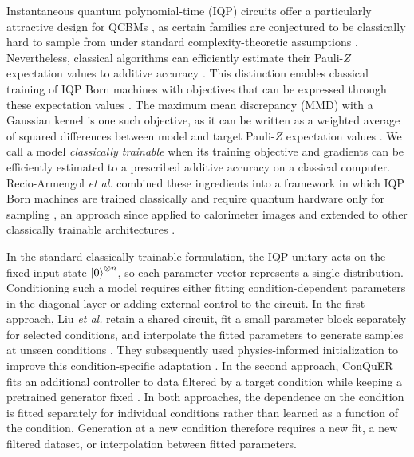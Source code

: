 \documentclass[pra,aps,10pt,twocolumn,floatfix,superscriptaddress, notitlepage,longbibliography]{revtex4-2}
\begin{document}
Instantaneous quantum polynomial-time (IQP) circuits \cite{shepherdInstantaneousQuantumComputation2009} offer a particularly attractive design for QCBMs \cite{coyleBornSupremacyQuantum2020}, as certain families are conjectured to be classically hard to sample from under standard complexity-theoretic assumptions \cite{bremnerClassicalSimulationCommuting2011,bremnerAverageCaseComplexityApproximate2016,bremnerAchievingQuantumSupremacy2017,marshallImprovedSeparationQuantum2024}. Nevertheless, classical algorithms can efficiently estimate their Pauli-$Z$ expectation values to additive accuracy \cite{nestSimulatingQuantumComputers2011}. This distinction enables classical training of IQP Born machines with objectives that can be expressed through these expectation values \cite{kastureProtocolsClassicallyTraining2023}. The maximum mean discrepancy (MMD) with a Gaussian kernel is one such objective, as it can be written as a weighted average of squared differences between model and target Pauli-$Z$ expectation values \cite{grettonKernelTwoSample2012,rudolphTrainabilityBarriersOpportunities2024}. We call a model \emph{classically trainable} when its training objective and gradients can be efficiently estimated to a prescribed additive accuracy on a classical computer. Recio-Armengol \textit{et al.} combined these ingredients into a framework in which IQP Born machines are trained classically and require quantum hardware only for sampling \cite{recio-armengolTrainClassicalDeploy2026}, an approach since applied to calorimeter images and extended to other classically trainable architectures \cite{slimIQPCalorimeter2026,huangSpectralBorn2026}.

In the standard classically trainable formulation, the IQP unitary acts on the fixed input state $\ket{0}^{\otimes n}$, so each parameter vector represents a single distribution. Conditioning such a model requires either fitting condition-dependent parameters in the diagonal layer or adding external control to the circuit. In the first approach, Liu \textit{et al.} retain a shared circuit, fit a small parameter block separately for selected conditions, and interpolate the fitted parameters to generate samples at unseen conditions \cite{liuCorrelationComplexity2026}. They subsequently used physics-informed initialization to improve this condition-specific adaptation \cite{liuPhysicsInformedLatent2026}. In the second approach, ConQuER fits an additional controller to data filtered by a target condition while keeping a pretrained generator fixed \cite{zouConQuER2025}. In both approaches, the dependence on the condition is fitted separately for individual conditions rather than learned as a function of the condition. Generation at a new condition therefore requires a new fit, a new filtered dataset, or interpolation between fitted parameters.
\end{document}
